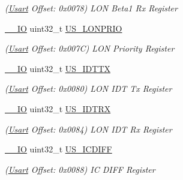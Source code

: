 \begin{DoxyCompactItemize}
\begin{DoxyCompactList}\small\item\em (\mbox{\hyperlink{structUsart}{Usart}} Offset\+: 0x0078) L\+ON Beta1 Rx Register \end{DoxyCompactList}\item 
\mbox{\label{structUsart_a24bf712b0013ae7f91de11e575f2feea}} 
\mbox{\hyperlink{core__cm7_8h_aec43007d9998a0a0e01faede4133d6be}{\+\_\+\+\_\+\+IO}} uint32\+\_\+t \mbox{\hyperlink{structUsart_a24bf712b0013ae7f91de11e575f2feea}{U\+S\+\_\+\+L\+O\+N\+P\+R\+IO}}
\begin{DoxyCompactList}\small\item\em (\mbox{\hyperlink{structUsart}{Usart}} Offset\+: 0x007C) L\+ON Priority Register \end{DoxyCompactList}\item 
\mbox{\label{structUsart_a283e625bb186b67bec9957e6d3b0a2c8}} 
\mbox{\hyperlink{core__cm7_8h_aec43007d9998a0a0e01faede4133d6be}{\+\_\+\+\_\+\+IO}} uint32\+\_\+t \mbox{\hyperlink{structUsart_a283e625bb186b67bec9957e6d3b0a2c8}{U\+S\+\_\+\+I\+D\+T\+TX}}
\begin{DoxyCompactList}\small\item\em (\mbox{\hyperlink{structUsart}{Usart}} Offset\+: 0x0080) L\+ON I\+DT Tx Register \end{DoxyCompactList}\item 
\mbox{\label{structUsart_ac63db3a9418e9d03d55825840e096962}} 
\mbox{\hyperlink{core__cm7_8h_aec43007d9998a0a0e01faede4133d6be}{\+\_\+\+\_\+\+IO}} uint32\+\_\+t \mbox{\hyperlink{structUsart_ac63db3a9418e9d03d55825840e096962}{U\+S\+\_\+\+I\+D\+T\+RX}}
\begin{DoxyCompactList}\small\item\em (\mbox{\hyperlink{structUsart}{Usart}} Offset\+: 0x0084) L\+ON I\+DT Rx Register \end{DoxyCompactList}\item 
\mbox{\label{structUsart_a02b13ce99b079765bac9b088b6f87553}} 
\mbox{\hyperlink{core__cm7_8h_aec43007d9998a0a0e01faede4133d6be}{\+\_\+\+\_\+\+IO}} uint32\+\_\+t \mbox{\hyperlink{structUsart_a02b13ce99b079765bac9b088b6f87553}{U\+S\+\_\+\+I\+C\+D\+I\+FF}}
\begin{DoxyCompactList}\small\item\em (\mbox{\hyperlink{structUsart}{Usart}} Offset\+: 0x0088) IC D\+I\+FF Register \end{DoxyCompactList}\item 

\end{DoxyCompactItemize}
